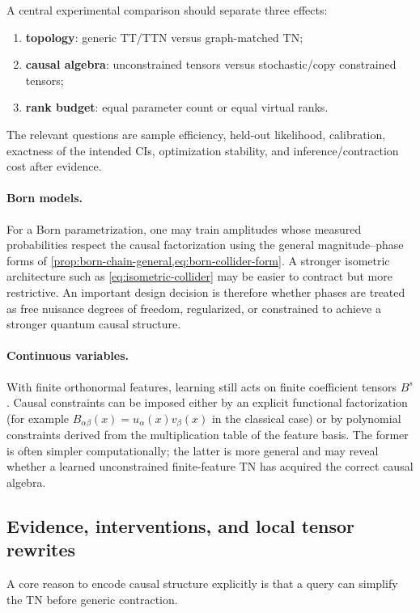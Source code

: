 \documentclass[11pt]{article}
\theoremstyle{remark}
\begin{document}
A central experimental comparison should separate three effects:
\begin{enumerate}
\item \textbf{topology}: generic TT/TTN versus graph-matched TN;
\item \textbf{causal algebra}: unconstrained tensors versus stochastic/copy constrained tensors;
\item \textbf{rank budget}: equal parameter count or equal virtual ranks.
\end{enumerate}
The relevant questions are sample efficiency, held-out likelihood, calibration, exactness of the intended CIs, optimization stability, and inference/contraction cost after evidence.

\paragraph{Born models.}
For a Born parametrization, one may train amplitudes whose measured probabilities respect the causal factorization using the general magnitude--phase forms of \cref{prop:born-chain-general,eq:born-collider-form}. A stronger isometric architecture such as \cref{eq:isometric-collider} may be easier to contract but more restrictive. An important design decision is therefore whether phases are treated as free nuisance degrees of freedom, regularized, or constrained to achieve a stronger quantum causal structure.

\paragraph{Continuous variables.}
With finite orthonormal features, learning still acts on finite coefficient tensors $B^s$. Causal constraints can be imposed either by an explicit functional factorization (for example $B_{\alpha\beta}(x)=u_\alpha(x)v_\beta(x)$ in the classical case) or by polynomial constraints derived from the multiplication table of the feature basis. The former is often simpler computationally; the latter is more general and may reveal whether a learned unconstrained finite-feature TN has acquired the correct causal algebra.

\subsection{Evidence, interventions, and local tensor rewrites}
\label{sec:synthesis-rewrites}

A core reason to encode causal structure explicitly is that a query can simplify the TN before generic contraction.
\end{document}
